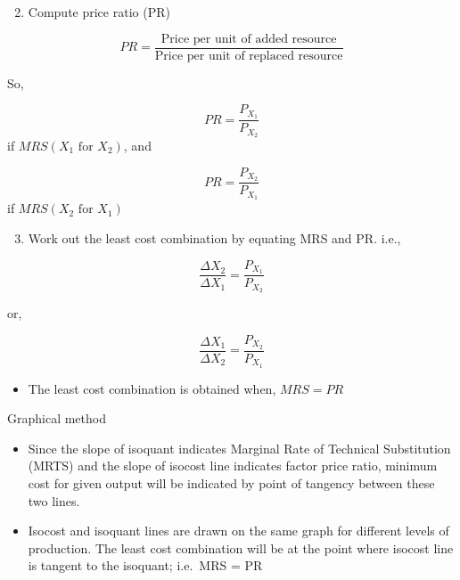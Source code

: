 \documentclass[12pt,ignorenonframetext,aspectratio=169]{beamer}
\providecommand{\tightlist}{%
  \setlength{\itemsep}{0pt}\setlength{\parskip}{0pt}}
\begin{document}
\begin{frame}{}
\protect\hypertarget{section-10}{}
\begin{enumerate}
\setcounter{enumi}{1}
\tightlist
\item
  Compute price ratio (PR)
\end{enumerate}

\[PR = \frac{\textrm{Price per unit of added resource}}{\textrm{Price per unit of replaced resource}}\]

So,

\[PR = \frac{P_{X_1}}{P_{X_2}}\] if \(MRS(X_1 \textrm{ for } X_2)\), and

\[PR = \frac{P_{X_2}}{P_{X_1}}\] if \(MRS(X_2 \textrm{ for } X_1)\)
\end{frame}

\begin{frame}{}
\protect\hypertarget{section-11}{}
\begin{enumerate}
\setcounter{enumi}{2}
\tightlist
\item
  Work out the least cost combination by equating MRS and PR. i.e.,
\end{enumerate}

\[
\frac{\Delta X_2}{\Delta X_1} = \frac{P_{X_1}}{P_{X_2}}
\]

or,

\[
\frac{\Delta X_1}{\Delta X_2} = \frac{P_{X_2}}{P_{X_1}}
\]

\begin{itemize}
\tightlist
\item
  The least cost combination is obtained when, \(MRS = PR\)
\end{itemize}
\end{frame}

\begin{frame}{Graphical method}
\protect\hypertarget{graphical-method}{}
\begin{itemize}
\item
  Since the slope of isoquant indicates Marginal Rate of Technical
  Substitution (MRTS) and the slope of isocost line indicates factor
  price ratio, minimum cost for given output will be indicated by point
  of tangency between these two lines.
\item
  Isocost and isoquant lines are drawn on the same graph for different
  levels of production. The least cost combination will be at the point
  where isocost line is tangent to the isoquant; i.e.~MRS = PR
\end{itemize}
\end{frame}
\end{document}
